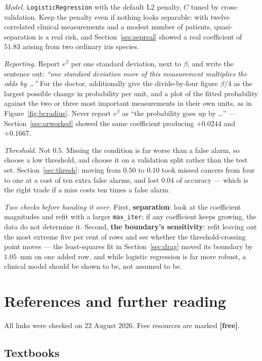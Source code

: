 \documentclass[11pt]{article}
\begin{document}
\emph{Model.} \texttt{LogisticRegression} with the default L2 penalty, $C$
tuned by cross-validation. Keep the penalty even if nothing looks separable:
with twelve correlated clinical measurements and a modest number of patients,
quasi-separation is a real risk, and Section~\ref{sec:sepreal} showed a real
coefficient of $51.83$ arising from two ordinary iris species.

\emph{Reporting.} Report $e^{\beta}$ per one standard deviation, next to
$\beta$, and write the sentence out: \emph{``one standard deviation more of
this measurement multiplies the odds by \dots''} For the doctor, additionally
give the divide-by-four figure $\beta/4$ as the largest possible change in
probability per unit, and a plot of the fitted probability against the two or
three most important measurements in their own units, as in
Figure~\ref{fig:bcradius}. Never report $e^{\beta}$ as ``the probability goes
up by \dots'' --- Section~\ref{sec:orworked} showed the same coefficient
producing $+0.0244$ and $+0.1667$.

\emph{Threshold.} Not $0.5$. Missing the condition is far worse than a false
alarm, so choose a low threshold, and choose it on a validation split rather
than the test set. Section~\ref{sec:thresh}: moving from $0.50$ to $0.10$ took
missed cancers from four to one at a cost of ten extra false alarms, and lost
$0.04$ of accuracy --- which is the right trade if a miss costs ten times a
false alarm.

\emph{Two checks before handing it over.} First, \textbf{separation}: look at
the coefficient magnitudes and refit with a larger \texttt{max\_iter}; if any
coefficient keeps growing, the data do not determine it. Second,
\textbf{the boundary's sensitivity}: refit leaving out the most extreme five
per cent of rows and see whether the threshold-crossing point moves --- the
least-squares fit in Section~\ref{sec:drag} moved its boundary by $1.05$~mm on
one added row, and while logistic regression is far more robust, a clinical
model should be shown to be, not assumed to be.

\section{References and further reading}
\label{sec:refs}

All links were checked on 22 August 2026. Free resources are marked
\textbf{[free]}.

\subsection*{Textbooks}
\end{document}
